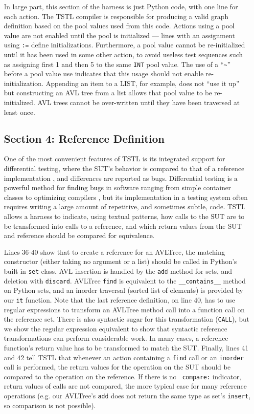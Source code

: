 \documentclass{sig-alternate}
\begin{document}
In large part, this section of the harness is just Python
code, with one line for each action.  The TSTL compiler is responsible
for producing a valid graph definition based on the pool values used
from this code.  Actions using a pool value are not enabled until the
pool is initialized --- lines with an assignment using {\tt :=} define
initializations.  Furthermore, a pool value cannot be re-initialized
until it has been used in some other action, to avoid useless test
sequences such as assigning first 1 and then 5 to the same {\tt INT}
pool value.  The use of a ``\verb|~|'' before a pool value use indicates that
this usage should not enable re-initialization.  Appending an item to
a LIST, for example, does not ``use it up'' but constructing an AVL
tree from a list allows that pool value to be re-initialized.  AVL
trees cannot be over-written until they have been traversed at least
once.


\subsection{Section 4: Reference Definition}

One of the most convenient features of TSTL is its integrated support
for differential testing, where the SUT's behavior is compared to that
of a reference implementation \cite{Differential,ICSEDiff}, and
differences are reported as bugs.  Differential testing is a powerful
method for finding bugs in software ranging from simple container
classes to optimizing compilers \cite{CSmith}, but its implementation
in a testing system often requires writing a large amount of
repetitive, and sometimes subtle, code.  TSTL allows a harness to
indicate, using textual patterns, how calls to the SUT are to be
transformed into calls to a reference, and which return values from
the SUT and reference should be compared for equivalence.

Lines 36-40 show that to create a reference for an AVLTree, the
matching constructor (either taking no argument or a list) should be
called in Python's built-in {\tt set} class.  AVL insertion is handled
by the {\tt add} method for sets, and deletion with {\tt discard}.
AVLTree {\tt find} is equivalent to the {\tt \_\_contains\_\_} method
on Python sets, and an inorder traversal (sorted list of elements) is
provided by our {\tt it} function.  Note that the last reference
definition, on line 40, has to use regular expressions to transform an
AVLTree method call into a function call on the reference set.  There
is also syntactic sugar for this transformation ({\tt CALL}), but we
show the regular expression equivalent to show that syntactic
reference transformations can perform considerable work.  In many
cases, a reference function's return value has to be transformed to
match the SUT.  Finally, lines 41 and 42 tell TSTL that whenever an
action containing a {\tt find} call or an {\tt inorder} call is
performed, the return values for the operation on the SUT should be
compared to the operation on the reference.  If there is no {\tt
compare:} indicator, return values of calls are not compared, the more
typical case for many reference operations (e.g. our AVLTree's {\tt add} does not
return the same type as set's {\tt insert}, so comparison is not
possible).
\end{document}
